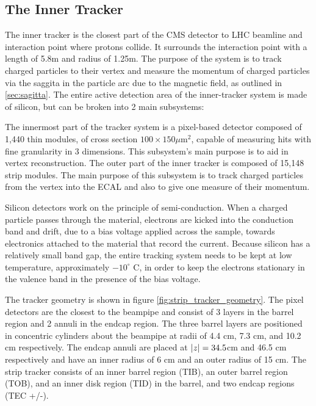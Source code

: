   \subsection{The Inner Tracker} \label{sec:inner_tracker}
    The inner tracker is the closest part of the CMS detector to LHC beamline and interaction point where protons collide. \cite{cms_jinst} It surrounds the interaction point with a length of 5.8m and radius of 1.25m. The purpose of the system is to track charged particles to their vertex and measure the momentum of charged particles via the saggita in the particle arc due to the magnetic field, as outlined in \ref{sec:sagitta}. The entire active detection area of the inner-tracker system is made of silicon, but can be broken into 2 main subsystems:

    \begin{enumerate}
       The innermost part of the tracker system is a pixel-based detector composed of 1,440 thin modules, of cross section $100 \times 150 \mu$m$^2$, capable of measuring hits with fine granularity in 3 dimensions. This subsystem's main purpose is to aid in vertex reconstruction.
       The outer part of the inner tracker is composed of 15,148 strip modules. The main purpose of this subsystem is to track charged particles from the vertex into the ECAL and also to give one measure of their momentum.
    \end{enumerate}

    Silicon detectors work on the principle of semi-conduction. When a charged particle passes through the material, electrons are kicked into the conduction band and drift, due to a bias voltage applied across the sample, towards electronics attached to the material that record the current. Because silicon has a relatively small band gap, the entire tracking system needs to be kept at low temperature, approximately $-10^\circ$ C, in order to keep the electrons stationary in the valence band in the presence of the bias voltage.

    The tracker geometry is shown in figure \ref{fig:strip_tracker_geometry}. The pixel detectors are the closest to the beampipe and consist of 3 layers in the barrel region and 2 annuli in the endcap region. The three barrel layers are positioned in concentric cylinders about the beampipe at radii of 4.4 cm, 7.3 cm, and 10.2 cm respectively. The endcap annuli are placed at $\lvert z \rvert = 34.5 $cm and 46.5 cm respectively and have an inner radius of 6 cm and an outer radius of 15 cm. The strip tracker consists of an inner barrel region (TIB), an outer barrel region (TOB), and an inner disk region (TID) in the barrel, and two endcap regions (TEC +/-). 


